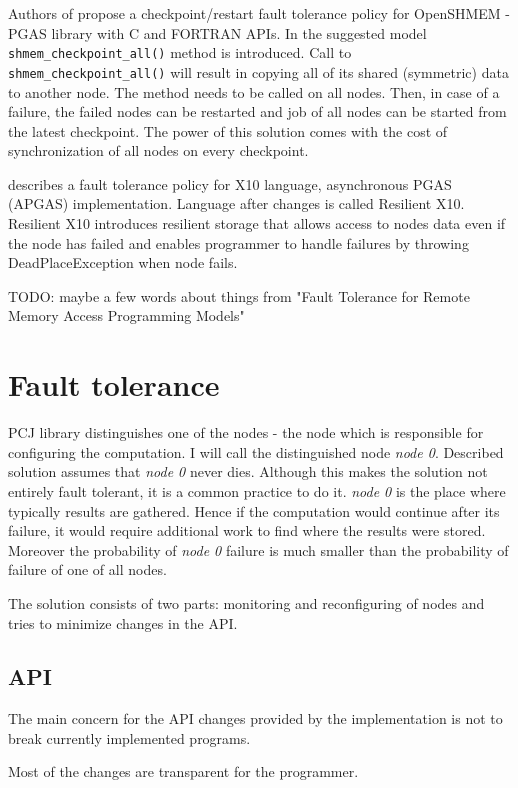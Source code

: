 \documentclass{llncs}
\newcommand{\inlinecode}{\texttt}
\begin{document}
Authors of \cite{shmem} propose a checkpoint/restart fault tolerance policy for OpenSHMEM - PGAS library with C and FORTRAN APIs.
In the suggested model \inlinecode{shmem\_checkpoint\_all()} method is introduced.
Call to \inlinecode{shmem\_checkpoint\_all()} will result in copying all of its shared (symmetric) data to another node.
The method needs to be called on all nodes.
Then, in case of a failure, the failed nodes can be restarted and job of all nodes can be started from the latest checkpoint.
The power of this solution comes with the cost of synchronization of all nodes on every checkpoint.

\cite{RX10} describes a fault tolerance policy for X10 language, asynchronous PGAS (APGAS) implementation.
Language after changes is called Resilient X10.
Resilient X10 introduces resilient storage that allows access to nodes data even if the node has failed
and enables programmer to handle failures by throwing DeadPlaceException when node fails.

TODO: maybe a few words about things from "Fault Tolerance for Remote Memory Access Programming Models"

\section{Fault tolerance}
PCJ library distinguishes one of the nodes - the node which is responsible for configuring the computation.
I will call the distinguished node \emph{node 0}.
Described solution assumes that \emph{node 0} never dies.
Although this makes the solution not entirely fault tolerant, it is a common practice to do it.
\emph{node 0} is the place where typically results are gathered.
Hence if the computation would continue after its failure, it would require additional work to find where the results were stored.
Moreover the probability of \emph{node 0} failure is much smaller than the probability of failure of one of all nodes.

The solution consists of two parts: monitoring and reconfiguring of nodes and tries to minimize changes in the API.

\subsection{API}
The main concern for the API changes provided by the implementation is not to break currently implemented programs.

Most of the changes are transparent for the programmer.
\end{document}
